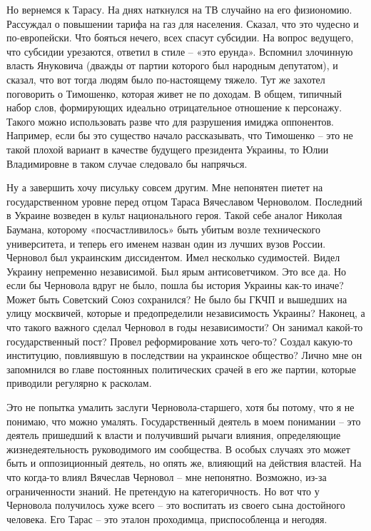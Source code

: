 Но вернемся к Тарасу. На днях наткнулся на ТВ случайно на его физиономию.
Рассуждал о повышении тарифа на газ для населения. Сказал, что это чудесно и
по-европейски. Что бояться нечего, всех спасут субсидии. На вопрос ведущего,
что субсидии урезаются, ответил в стиле – «это ерунда». Вспомнил злочинную
власть Януковича (дважды от партии которого был народным депутатом), и сказал,
что вот тогда людям было по-настоящему тяжело. Тут же захотел поговорить о
Тимошенко, которая живет не по доходам. В общем, типичный набор слов,
формирующих идеально отрицательное отношение к персонажу. Такого можно
использовать разве что для разрушения имиджа оппонентов. Например, если бы это
существо начало рассказывать, что Тимошенко – это не такой плохой вариант в
качестве будущего президента Украины, то Юлии Владимировне в таком случае
следовало бы напрячься. 

Ну а завершить хочу писульку совсем другим. Мне непонятен пиетет на
государственном уровне перед отцом Тараса Вячеславом Черноволом. Последний в
Украине возведен в культ национального героя. Такой себе аналог Николая
Баумана, которому «посчастливилось» быть убитым возле технического
университета, и теперь его именем назван один из лучших вузов России. Черновол
был украинским диссидентом. Имел несколько судимостей. Видел Украину непременно
независимой. Был ярым антисоветчиком. Это все да. Но если бы Черновола вдруг не
было, пошла бы история Украины как-то иначе? Может быть Советский Союз
сохранился? Не было бы ГКЧП и вышедших на улицу москвичей, которые и
предопределили независимость Украины? Наконец, а что такого важного сделал
Черновол в годы независимости? Он занимал какой-то государственный пост? Провел
реформирование хоть чего-то? Создал какую-то институцию, повлиявшую в
последствии на украинское общество? Лично мне он запомнился во главе постоянных
политических срачей в его же партии, которые приводили регулярно к расколам.

Это не попытка умалить заслуги Черновола-старшего, хотя бы потому, что я не
понимаю, что можно умалять. Государственный деятель в моем понимании – это
деятель пришедший к власти и получивший рычаги влияния, определяющие
жизнедеятельность руководимого им сообщества. В особых случаях это может быть и
оппозиционный деятель, но опять же, влияющий на действия властей. На что
когда-то влиял Вячеслав Черновол – мне непонятно. Возможно, из-за
ограниченности знаний. Не претендую на категоричность. Но вот что у Черновола
получилось хуже всего – это воспитать из своего сына достойного человека. Его
Тарас – это эталон проходимца, приспособленца и негодяя.

